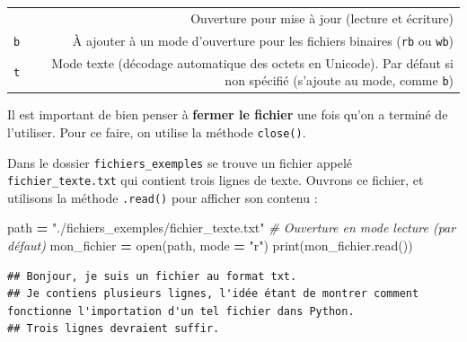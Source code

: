 \documentclass[12pt,]{book}
\newenvironment{Shaded}{\begin{snugshade}}{\end{snugshade}}
\newcommand{\StringTok}[1]{\textcolor[rgb]{0.31,0.60,0.02}{#1}}
\newcommand{\CommentTok}[1]{\textcolor[rgb]{0.56,0.35,0.01}{\textit{#1}}}
\newcommand{\OperatorTok}[1]{\textcolor[rgb]{0.81,0.36,0.00}{\textbf{#1}}}
\newcommand{\BuiltInTok}[1]{#1}
\newcommand{\NormalTok}[1]{#1}
\numberwithin{equation}{section}
\numberwithin{countremarque}{section}
\begin{document}
\begin{longtable}[]{@{}rr@{}}
\begin{minipage}[t]{0.12\columnwidth}
\end{minipage} & \begin{minipage}[t]{0.69\columnwidth}\raggedleft\strut
Ouverture pour mise à jour (lecture et écriture)\strut
\end{minipage}\tabularnewline
\begin{minipage}[t]{0.12\columnwidth}\raggedleft\strut
\texttt{b}\strut
\end{minipage} & \begin{minipage}[t]{0.69\columnwidth}\raggedleft\strut
À ajouter à un mode d'ouverture pour les fichiers binaires (\texttt{rb}
ou \texttt{wb})\strut
\end{minipage}\tabularnewline
\begin{minipage}[t]{0.12\columnwidth}\raggedleft\strut
\texttt{t}\strut
\end{minipage} & \begin{minipage}[t]{0.69\columnwidth}\raggedleft\strut
Mode texte (décodage automatique des octets en Unicode). Par défaut si
non spécifié (s'ajoute au mode, comme \texttt{b})\strut
\end{minipage}\tabularnewline
\bottomrule
\end{longtable}

Il est important de bien penser à \textbf{fermer le fichier} une fois
qu'on a terminé de l'utiliser. Pour ce faire, on utilise la méthode
\texttt{close()}.

Dans le dossier \texttt{fichiers\_exemples} se trouve un fichier appelé
\texttt{fichier\_texte.txt} qui contient trois lignes de texte. Ouvrons
ce fichier, et utilisons la méthode \texttt{.read()} pour afficher son
contenu :

\begin{Shaded}
\begin{Highlighting}[]
\NormalTok{path }\OperatorTok{=} \StringTok{"./fichiers_exemples/fichier_texte.txt"}
\CommentTok{# Ouverture en mode lecture (par défaut)}
\NormalTok{mon_fichier }\OperatorTok{=} \BuiltInTok{open}\NormalTok{(path, mode }\OperatorTok{=} \StringTok{"r"}\NormalTok{)}
\BuiltInTok{print}\NormalTok{(mon_fichier.read())}
\end{Highlighting}
\end{Shaded}

\begin{lstlisting}
## Bonjour, je suis un fichier au format txt.
## Je contiens plusieurs lignes, l'idée étant de montrer comment fonctionne l'importation d'un tel fichier dans Python.
## Trois lignes devraient suffir.
\end{lstlisting}
\end{document}
